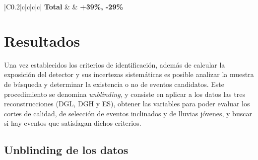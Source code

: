 \begin{table}[ht!]
\begin{tabular}{|C{0.2\textwidth}|c|c|c|c|}
		\hline
		\hline
		{\bf Total}                     &   {}  & {\bf +39\%, -29\%}         \\
		\hline
		\end{tabular}
		\caption{Resumen de las fuentes de error sistemático consideradas en este trabajo. Luego de obtener la estimación debida a cada fuente para cada canal se combinaron utilizando la ecuación \ref{eq:sistErr03}, lo que se muestra en la última columna. Por último el error en la exposición total se obtuvo sumando en cuadratura los valores expuestos en la última columna.}
		\label{tab:sist}
	\end{table}

\chapter{Resultados}
\label{ch:resAuger}
Una vez establecidos los criterios de identificaci\'on, adem\'as de calcular la exposici\'on del detector y sus incertezas sistem\'aticas es posible analizar la muestra de b\'usqueda y determinar la existencia o no de eventos candidatos. 
Este procedimiento se denomina \emph{unblinding}, y consiste en aplicar a los datos las tres reconstrucciones (DGL, DGH y ES), obtener las variables para poder evaluar los cortes de calidad, de selecci\'on de eventos inclinados y de lluvias j\'ovenes, y buscar si hay eventos que satisfagan dichos criterios.
	
	\section{Unblinding de los datos}
	
